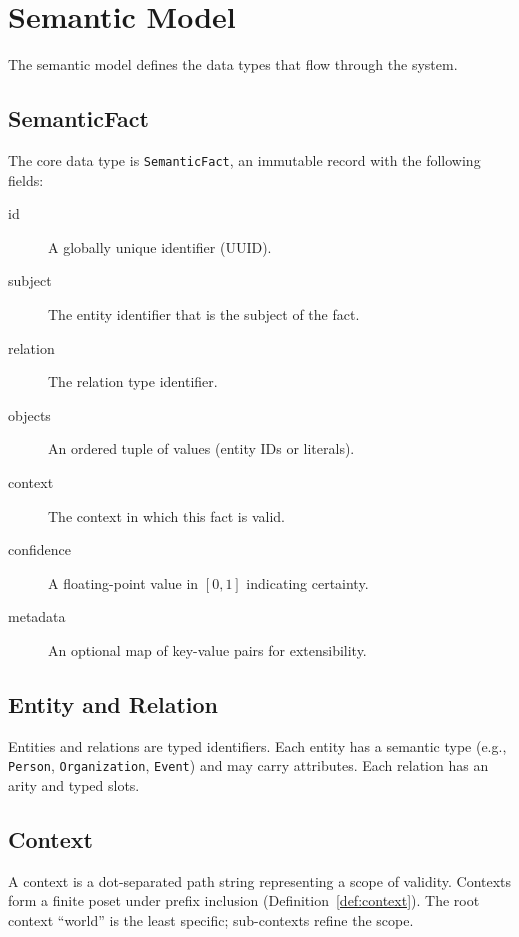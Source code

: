 \section{Semantic Model}
\label{sec:semantic-model}

The semantic model defines the data types that flow through the system.

\subsection{SemanticFact}
\label{sec:semantic-model:fact}

The core data type is \texttt{SemanticFact}, an immutable record with the
following fields:

\begin{description}
    \item[id] A globally unique identifier (UUID).
    \item[subject] The entity identifier that is the subject of the fact.
    \item[relation] The relation type identifier.
    \item[objects] An ordered tuple of values (entity IDs or literals).
    \item[context] The context in which this fact is valid.
    \item[confidence] A floating-point value in $[0, 1]$ indicating
          certainty.
    \item[metadata] An optional map of key-value pairs for extensibility.
\end{description}

\subsection{Entity and Relation}
\label{sec:semantic-model:entity}

Entities and relations are typed identifiers. Each entity has a semantic
type (e.g., \texttt{Person}, \texttt{Organization}, \texttt{Event}) and
may carry attributes. Each relation has an arity and typed slots.

\subsection{Context}
\label{sec:semantic-model:context}

A context is a dot-separated path string representing a scope of validity.
Contexts form a finite poset under prefix inclusion (Definition~\ref{def:context}).
The root context ``world'' is the least specific; sub-contexts refine the scope.

